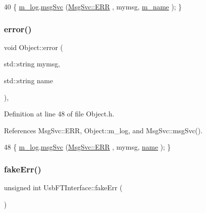 \begin{DoxyCode}
40 \{ \hyperlink{classObject_a0d269813dd7ac1f24bc143031e2963f2}{m\_log}.\hyperlink{classMsgSvc_ad25f18047920cc59a314e5098259711c}{msgSvc} (\hyperlink{classMsgSvc_ae671eb7301996cd049d2da8a65925926a35a9d7166e9896af4ec8fb33bf5f1772}{MsgSvc::ERR}     , mymsg, \hyperlink{classObject_a8b83c95c705d2c3ba0d081fe1710f48d}{m\_name} ); \}
\end{DoxyCode}
\mbox{\label{classObject_ad7f6c457733082efa2f9ff5f5c8e119a}} 
\subsubsection{\texorpdfstring{error()}{error()}\hspace{0.1cm}{\footnotesize\ttfamily [2/2]}}
{\footnotesize\ttfamily void Object\+::error (\begin{DoxyParamCaption}\item[{std\+::string}]{mymsg,  }\item[{std\+::string}]{name }\end{DoxyParamCaption})\hspace{0.3cm}{\ttfamily [inline]}, {\ttfamily [inherited]}}



Definition at line 48 of file Object.\+h.



References Msg\+Svc\+::\+E\+RR, Object\+::m\+\_\+log, and Msg\+Svc\+::msg\+Svc().


\begin{DoxyCode}
48 \{ \hyperlink{classObject_a0d269813dd7ac1f24bc143031e2963f2}{m\_log}.\hyperlink{classMsgSvc_ad25f18047920cc59a314e5098259711c}{msgSvc} (\hyperlink{classMsgSvc_ae671eb7301996cd049d2da8a65925926a35a9d7166e9896af4ec8fb33bf5f1772}{MsgSvc::ERR}     , mymsg, \hyperlink{classObject_a300f4c05dd468c7bb8b3c968868443c1}{name} ); \}
\end{DoxyCode}
\mbox{\label{classUsbFTInterface_abb29c7f73506259ef57d1e25204f8f7c}} 
\subsubsection{\texorpdfstring{fake\+Err()}{fakeErr()}}
{\footnotesize\ttfamily unsigned int Usb\+F\+T\+Interface\+::fake\+Err (\begin{DoxyParamCaption}{ }\end{DoxyParamCaption})\hspace{0.3cm}{\ttfamily [inline]}}

